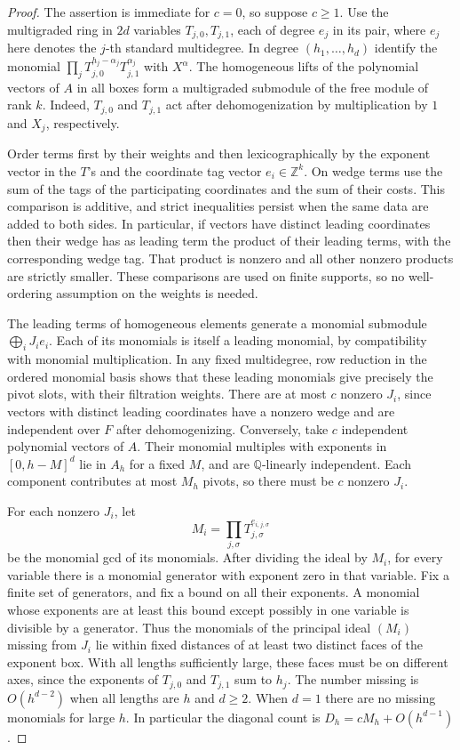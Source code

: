 \documentclass[11pt,a4paper,reqno]{amsart}
\theoremstyle{definition}
\theoremstyle{remark}
\numberwithin{equation}{section}
\begin{document}
\begin{proof}
The assertion is immediate for \(c=0\), so suppose \(c\geq1\).
Use the multigraded ring in \(2d\) variables \(T_{j,0},T_{j,1}\),
each of degree \(e_j\) in its pair, where \(e_j\) here denotes the
\(j\)-th standard multidegree. In degree \((h_1,\ldots,h_d)\)
identify the monomial
\(\prod_j T_{j,0}^{h_j-\alpha_j}T_{j,1}^{\alpha_j}\) with \(X^\alpha\).
The homogeneous lifts of the polynomial vectors of \(A\) in all
boxes form a multigraded submodule of the free module of rank \(k\).
Indeed, \(T_{j,0}\) and \(T_{j,1}\) act after dehomogenization by
multiplication by \(1\) and \(X_j\), respectively.

Order terms first by their weights and then lexicographically by
the exponent vector in the \(T\)'s and the coordinate tag vector
\(e_i\in\mathbb Z^k\). On wedge terms use the sum of the tags of the
participating coordinates and the sum of their costs. This comparison
is additive, and strict inequalities persist when the same data
are added to both sides. In particular, if vectors have distinct
leading coordinates then their wedge has as leading term the
product of their leading terms, with the corresponding wedge tag.
That product is nonzero and all other nonzero products are strictly
smaller. These comparisons are used on finite supports, so no
well-ordering assumption on the weights is needed.

The leading terms of homogeneous elements generate a monomial
submodule \(\bigoplus_i J_i e_i\). Each of its monomials is itself
a leading monomial, by compatibility with monomial multiplication.
In any fixed multidegree, row reduction in the ordered monomial
basis shows that these leading monomials give precisely the pivot
slots, with their filtration weights. There are at most \(c\)
nonzero \(J_i\), since vectors with distinct leading coordinates
have a nonzero wedge and are independent over \(F\) after
dehomogenizing. Conversely, take \(c\) independent polynomial
vectors of \(A\). Their monomial multiples with exponents in
\([0,h-M]^d\) lie in \(A_h\) for a fixed \(M\), and are
\(\mathbb Q\)-linearly independent. Each component contributes at
most \(M_h\) pivots, so there must be \(c\) nonzero \(J_i\).

For each nonzero \(J_i\), let
\[
 M_i=\prod_{j,\sigma}T_{j,\sigma}^{e_{i,j,\sigma}}
\]
be the monomial gcd of its monomials. After dividing the ideal by
\(M_i\), for every variable there is a monomial generator with
exponent zero in that variable. Fix a finite set of generators,
and fix a bound on all their exponents. A monomial whose exponents
are at least this bound except possibly in one variable is divisible
by a generator. Thus the monomials of the principal ideal \((M_i)\)
missing from \(J_i\) lie within fixed distances of at least two
distinct faces of the exponent box. With all lengths sufficiently
large, these faces must be on different axes, since the exponents
of \(T_{j,0}\) and \(T_{j,1}\) sum to \(h_j\). The number missing is
\(O(h^{d-2})\) when all lengths are \(h\) and \(d\geq 2\). When
\(d=1\) there are no missing monomials for large \(h\). In particular
the diagonal count is \(D_h=cM_h+O(h^{d-1})\).


\end{proof}
\end{document}
